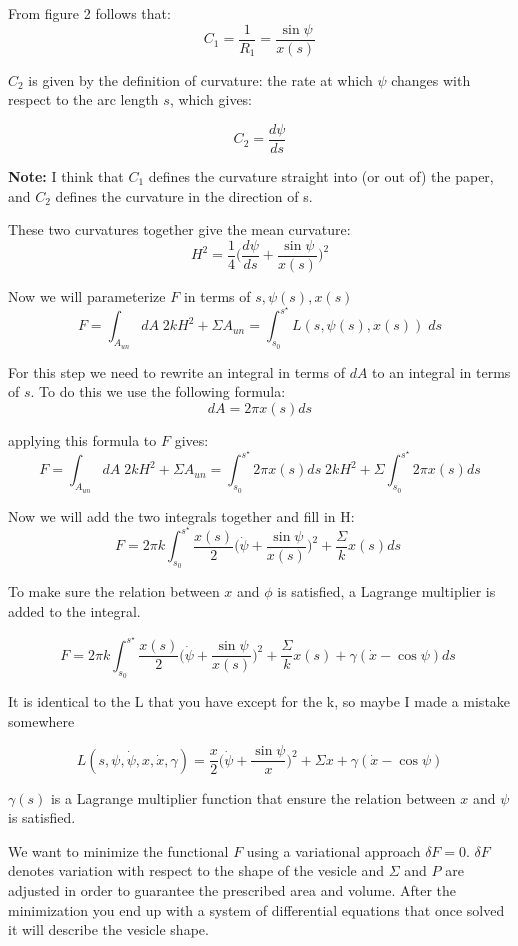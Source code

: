 \documentclass[12pt]{article}
\begin{document}
From figure 2 follows that:
$$
C_1=\frac{1}{R_1}=\frac{\sin{\psi}}{x(s)}
$$

$C_2$ is given by the definition of curvature: the rate at which $\psi$ changes with respect to the arc length $s$, which gives:

$$
C_2=\frac{d\psi}{ds}
$$

\textbf{Note:}  I think that $C_1$ defines the curvature straight into (or out of) the paper, and $C_2$ defines the curvature in the direction of s. 

These two curvatures together give the mean curvature:
$$
H^2=\frac{1}{4}\bigg(\frac{d\psi}{ds}+\frac{\sin{\psi}}{x(s)}\bigg)^2
$$


Now we will parameterize $F$ in terms of $s, \psi(s), x(s)$
$$
F = \int_{A_{un}} dA \; 2kH^2  + \Sigma A_{un} = \int_{s_0}^{s^\star} L(s,\psi(s),x(s)) \; ds
$$


For this step we need to rewrite an integral in terms of $dA$ to an integral in terms of $s$. To do this we use the following formula:
$$
dA=2\pi x(s)ds
$$

applying this formula to $F$ gives:
$$
F = \int_{A_{un}} dA \; 2kH^2  + \Sigma A_{un} = \int_{s_0}^{s^\star} 2\pi x(s)ds \; 2kH^2 + \Sigma \int_{s_0}^{s^\star} 2\pi x(s)  ds
$$

Now we will add the two integrals together and fill in H:
$$
F = 2\pi k \int_{s_0}^{s^\star} \frac{x(s)}{2} \bigg(\dot{\psi}+\frac{\sin{\psi}}{x(s)}\bigg)^2  + \frac{\Sigma}{k} x(s) ds \;
$$

To make sure the relation between $x$ and $\phi$ is satisfied, a Lagrange multiplier is added to the integral.

$$
F = 2\pi k \int_{s_0}^{s^\star} \frac{x(s)}{2} \bigg(\dot{\psi}+\frac{\sin{\psi}}{x(s)}\bigg)^2  + \frac{\Sigma}{k} x(s) +\gamma(\dot{x}-\cos \psi)ds\;
$$

\alert{It is identical to the L that you have except for the k, so maybe I made a mistake somewhere} 


$$
L(s,\psi,\dot{\psi},x,\dot{x},\gamma) = \frac{x}{2} \bigg(\dot{\psi}+\frac{\sin \psi}{x}\bigg)^2 + \Sigma x + \gamma(\dot{x}-\cos \psi)
$$

$\gamma(s)$ is a Lagrange multiplier function that ensure the relation between $x$ and $\psi$ is satisfied.

We want to minimize the functional $F$ using a variational approach $\delta F=0$. $\delta F$ denotes variation with respect to the shape of the vesicle and $\Sigma$ and $P$ are adjusted in order to guarantee the prescribed area and volume. After the minimization you end up with a system of differential equations that once solved it will describe the vesicle shape.
\end{document}

